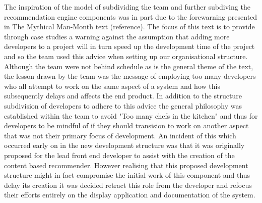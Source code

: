 \documentclass{l3proj}
\begin{document}
The inspiration of the model of subdividing the team and further subdiving the recommendation engine components was in part due to the forewarning presented in The Mythical Man-Month text (reference). The focus of this text is to provide through case studies a warning against the assumption that adding more developers to a project will in turn speed up the development time of the project and so the team used this advice when setting up our organisational structure. Although the team were not behind schedule as is the general theme of the text, the lesson drawn by the team was the message of employing too many developers who all attempt to work on the same aspect of a system and how this subsequently delays and affects the end product. In addition to the structure subdivision of developers to adhere to this advice the general philosophy was established within the team to avoid "Too many chefs in the kitchen" and thus for developers to be mindful of if they should transision to work on another aspect that was not their primary focus of development. An incident of this which occurred early on in the new development structure was that it was originally proposed for the lead front end developer to assist with the creation of the content based recommender. However realising that this proposed development structure might in fact compromise the initial work of this component and thus delay its creation it was decided retract this role from the developer and refocus their efforts entirely on the display application and documentation of the system. %
\end{document}
